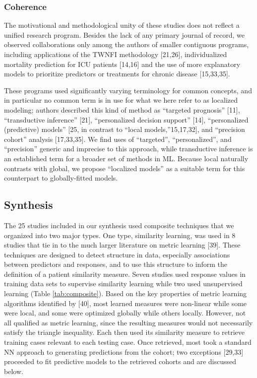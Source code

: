 \documentclass[preprint, 3p,
authoryear]{elsarticle} %
\begin{document}
\hypertarget{coherence}{%
\subsubsection{Coherence}\label{coherence}}

The motivational and methodological unity of these studies does not
reflect a unified research program. Besides the lack of any primary
journal of record, we observed collaborations only among the authors of
smaller contiguous programs, including applications of the TWNFI
methodology {[}21,26{]}, individualized mortality prediction for ICU
patients {[}14,16{]} and the use of more explanatory models to
prioritize predictors or treatments for chronic disease {[}15,33,35{]}.

These programs used significantly varying terminology for common
concepts, and in particular no common term is in use for what we here
refer to as localized modeling; authors described this kind of method as
``targeted prognosis'' {[}11{]}, ``transductive inference'' {[}21{]},
``personalized decision support'' {[}14{]}, ``personalized (predictive)
models'' {[}25, in contrast to ``local models,''15,17,32{]}, and
``precision cohort'' analysis {[}17,33,35{]}. We find uses of
``targeted'', ``personalized'', and ``precision'' generic and imprecise
to this approach, while transductive inference is an established term
for a broader set of methods in ML. Because local naturally contrasts
with global, we propose ``localized models'' as a suitable term for this
counterpart to globally-fitted models.

\hypertarget{synthesis-1}{%
\subsection{Synthesis}\label{synthesis-1}}

The 25 studies included in our synthesis used composite techniques that
we organized into two major types. One type, similarity learning, was
used in 8 studies that tie in to the much larger literature on metric
learning {[}39{]}. These techniques are designed to detect structure in
data, especially associations between predictors and responses, and to
use this structure to inform the definition of a patient similarity
measure. Seven studies used response values in training data sets to
supervise similarity learning while two used unsupervised learning
(Table \ref{tab:composite}). Based on the key properties of metric
learning algorithms identified by {[}40{]}, most learned measures were
non-linear while some were local, and some were optimized globally while
others locally. However, not all qualified as metric learning, since the
resulting measures would not necessarily satisfy the triangle
inequality. Each then used its similarity measure to retrieve training
cases relevant to each testing case. Once retrieved, most took a
standard NN approach to generating predictions from the cohort; two
exceptions {[}29,33{]} proceeded to fit predictive models to the
retrieved cohorts and are discussed below.
\end{document}
